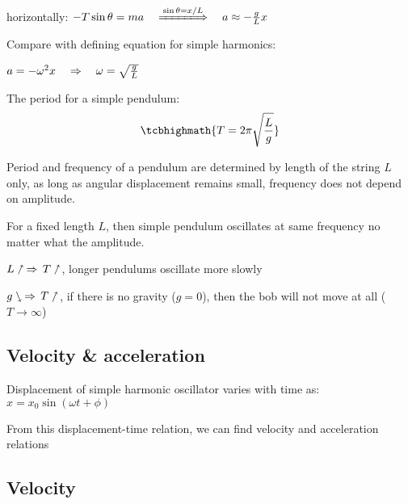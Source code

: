 horizontally: $-T\sin\theta = ma \quad \xLongrightarrow{\sin\theta=x/L} \quad a \approx -\frac{g}{L}x$

Compare with defining equation for simple harmonics:

{

\centering

$a=-\omega^2x \quad \Rightarrow \quad \omega = \sqrt{\frac{g}{L}}$

}
	
The period for a simple pendulum: $$\tcbhighmath{T= 2\pi\sqrt{\frac{L}{g}}}$$

Period and frequency of a pendulum are determined by length of the string $L$ only, as long as angular displacement remains small, frequency does not depend on amplitude.

For a fixed length $L$, then simple pendulum oscillates at same frequency no matter what the amplitude.

\cmt $L \nnearrow \, \Rightarrow \, T \nnearrow$, longer pendulums oscillate more slowly

\cmt $g \ssearrow \, \Rightarrow \, T \nnearrow$, if there is no gravity ($g=0$), then the bob will not move at all  ($T\to \infty$)





\subsection{Velocity \& acceleration}

Displacement of simple harmonic oscillator varies with time as: $x=x_0\sin(\omega t + \phi)$

From this displacement-time relation, we can find velocity and acceleration relations

\subsection*{Velocity}

